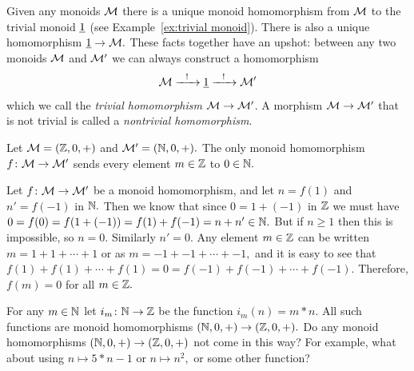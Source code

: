 \documentclass[CT4S-EN-RU]{subfiles}
\begin{document}
\begin{applicationRUS}\label{app:RNA reader 1}
\end{applicationRUS}

\begin{exampleENG}\label{ex:trivial monoid homomorphism}
Given any monoids $\mathcal{M}$ there is a unique monoid homomorphism from $\mathcal{M}$ to the trivial monoid $\underline{1}$ (see Example~\ref{ex:trivial monoid}). There is also a unique homomorphism $\underline{1}\rightarrow\mathcal{M}.$ These facts together have an upshot: between any two monoids $\mathcal{M}$ and $\mathcal{M}'$ we can always construct a homomorphism
$$\mathcal{M}\xrightarrow{\ \ !\ \ }\underline{1}\xrightarrow{\ \ !\ \ }\mathcal{M}'$$
which we call the {\em trivial homomorphism $\mathcal{M}\rightarrow\mathcal{M}'$}. A morphism $\mathcal{M}\rightarrow\mathcal{M}'$ that is not trivial is called a {\em nontrivial homomorphism}.
\end{exampleENG}

\begin{exampleRUS}\label{ex:trivial monoid homomorphism}
\end{exampleRUS}

\begin{propositionENG}\label{prop:int to nat trivial}
Let $\mathcal{M}=({\mathbb Z},0,+)$ and $\mathcal{M}'=({\mathbb N},0,+).$ The only monoid homomorphism $f\colon\mathcal{M}\rightarrow\mathcal{M}'$ sends every element $m\in{\mathbb Z}$ to $0\in{\mathbb N}.$
\end{propositionENG}

\begin{propositionRUS}\label{prop:int to nat trivial}
\end{propositionRUS}

\begin{proofENG}
Let $f\colon\mathcal{M}\rightarrow\mathcal{M}'$ be a monoid homomorphism, and let $n=f(1)$ and $n'=f(-1)$ in ${\mathbb N}.$ Then we know that since $0=1+(-1)$ in ${\mathbb Z}$ we must have $0=f(0)=f(1+(-1))=f(1)+f(-1)=n+n'\in{\mathbb N}.$ But if $n\geq 1$ then this is impossible, so $n=0.$ Similarly $n'=0.$ Any element $m\in{\mathbb Z}$ can be written $m=1+1+\cdots+1$ or as $m=-1+-1+\cdots+-1,$ and it is easy to see that $f(1)+f(1)+\cdots+f(1)=0=f(-1)+f(-1)+\cdots+f(-1).$ Therefore, $f(m)=0$ for all $m\in{\mathbb Z}.$
\end{proofENG}

\begin{proofRUS}
\end{proofRUS}

\begin{exerciseENG}
For any $m\in{\mathbb N}$ let $i_m\colon{\mathbb N}\rightarrow{\mathbb Z}$ be the function $i_m(n)=m*n.$ All such functions are monoid homomorphisms $({\mathbb N},0,+)\rightarrow({\mathbb Z},0,+).$ Do any monoid homomorphisms $({\mathbb N},0,+)\rightarrow({\mathbb Z},0,+)$ not come in this way? For example, what about using $n\mapsto 5*n-1$ or $n\mapsto n^2,$ or some other function?
\end{exerciseENG}
\end{document}
